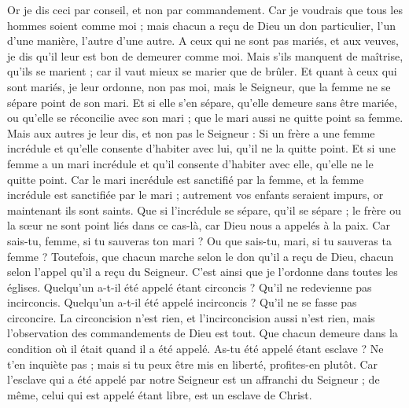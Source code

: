 \begin{multicols}{2}
Or je dis ceci par conseil, et non par commandement.
Car je voudrais que tous les hommes soient comme moi ; mais chacun a reçu de Dieu un don particulier, l'un d’une manière, l’autre d’une autre.
A ceux qui ne sont pas mariés, et aux veuves, je dis qu'il leur est bon de demeurer comme moi.
Mais s'ils manquent de maîtrise, qu'ils se marient ; car il vaut mieux se marier que de brûler.
Et quant à ceux qui sont mariés, je leur ordonne, non pas moi, mais le Seigneur, que la femme ne se sépare point de son mari.
Et si elle s'en sépare, qu'elle demeure sans être mariée, ou qu'elle se réconcilie avec son mari ; que le mari aussi ne quitte point sa femme.
Mais aux autres je leur dis, et non pas le Seigneur : Si un frère a une femme incrédule et qu'elle consente d'habiter avec lui, qu'il ne la quitte point.
Et si une femme a un mari incrédule et qu'il consente d'habiter avec elle, qu'elle ne le quitte point.
Car le mari incrédule est sanctifié par la femme, et la femme incrédule est sanctifiée par le mari ; autrement vos enfants seraient impurs, or maintenant ils sont saints.
Que si l'incrédule se sépare, qu'il se sépare ; le frère ou la sœur ne sont point liés dans ce cas-là, car Dieu nous a appelés à la paix.
Car sais-tu, femme, si tu sauveras ton mari ? Ou que sais-tu, mari, si tu sauveras ta femme ?
Toutefois, que chacun marche selon le don qu'il a reçu de Dieu, chacun selon l’appel qu’il a reçu du Seigneur. C’est ainsi que je l’ordonne dans toutes les églises.
Quelqu'un a-t-il été appelé étant circoncis ? Qu’il ne redevienne pas incirconcis. Quelqu'un a-t-il été appelé incirconcis ? Qu’il ne se fasse pas circoncire.
La circoncision n'est rien, et l’incirconcision aussi n'est rien, mais l'observation des commandements de Dieu est tout.
Que chacun demeure dans la condition où il était quand il a été appelé.
As-tu été appelé étant esclave ? Ne t'en inquiète pas ; mais si tu peux être mis en liberté, profites-en plutôt.
Car l’esclave qui a été appelé par notre Seigneur est un affranchi du Seigneur ; de même, celui qui est appelé étant libre, est un esclave de Christ.

\end{multicols}
